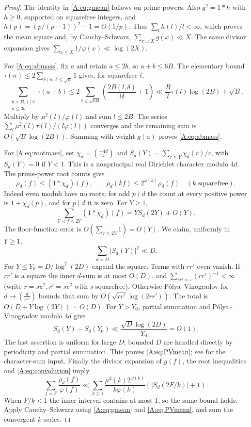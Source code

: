 \documentclass[10pt,reqno]{amsart}
\theoremstyle{definition}
\numberwithin{equation}{section}
\begin{document}
\begin{proof}
The identity in \eqref{A:eq:gmean} follows on prime powers. Also
$g^2=1*h$ with $h\ge0$, supported on squarefree integers, and
$h(p)=(p/(p-1))^2-1=O(1/p)$. Thus $\sum_lh(l)/l<\infty$, which proves
the mean square and, by Cauchy--Schwarz, $\sum_{x\asymp X}g(x)\ll X$.
The same divisor expansion gives $\sum_{x\le X}1/\varphi(x)\ll\log(2X)$.

For \eqref{A:eq:abmass}, fix $a$ and retain $a\le2b$, so $a+b\le6B$.
The elementary bound $\tau(n)\le2\sum_{\delta\mid n,\,\delta\le\sqrt n}1$
gives, for squarefree $l$,
\[
 \sum_{\substack{b\asymp B,\ l\mid b\\a\le2b}}\tau(a+b)
 \le2\sum_{\delta\le\sqrt{6B}}
       \left(\frac{2B(l,\delta)}{l\delta}+1\right)
 \ll\frac B l\tau(l)\log(2B)+\sqrt B.
\]
Multiply by $\mu^2(l)/\varphi(l)$ and sum $l\le2B$.
The series $\sum_l\mu^2(l)\tau(l)/(l\varphi(l))$ converges and the
remaining sum is $O(\sqrt B\log(2B))$. Summing with weight $g(a)$ proves
\eqref{A:eq:abmass}.

For \eqref{A:eq:rootmass}, set $\chi_d=(\frac{-4d}{\cdot})$ and
$S_d(Y)=\sum_{r\le Y}\chi_d(r)/r$, with $S_d(Y)=0$ if $Y<1$.
This is a nonprincipal real Dirichlet character modulo $4d$.
The prime-power root counts give
\[
 \rho_d(f)\le(1*\chi_d)(f),\qquad
 \rho_d(kf)\le2^{\omega(k)}\rho_d(f)\quad(k\text{ squarefree}).
\]
Indeed even moduli have no roots; for odd $p\nmid d$ the count at every
positive power is $1+\chi_d(p)$, and for $p\mid d$ it is zero.
For $Y\ge1$,
\begin{equation}\label{A:eq:convolution}
 \sum_{Y<f\le2Y}(1*\chi_d)(f)=Y S_d(2Y)+O(Y).
\end{equation}
The floor-function error is $O(\sum_{r\le2Y}1)=O(Y)$.
We claim, uniformly in $Y\ge1$,
\begin{equation}\label{A:eq:PVmean}
 \sum_{d\asymp D}|S_d(Y)|^2\ll D.
\end{equation}
For $Y\le Y_0=D/\log^2(2D)$ expand the square. Terms with $rr'$ even
vanish. If $rr'$ is a square the inner $d$-sum is at most $O(D)$, and
$\sum_{rr'=\square}(rr')^{-1}<\infty$ (write $r=su^2,r'=sv^2$ with $s$
squarefree). Otherwise P\'olya--Vinogradov for
$d\mapsto(\frac d{rr'})$ bounds that sum by
$O(\sqrt{rr'}\log(2rr'))$. The total is
$O(D+Y\log(2Y))=O(D)$. For $Y>Y_0$, partial summation and
P\'olya--Vinogradov modulo $4d$ give
\[
 S_d(Y)-S_d(Y_0)\ll\frac{\sqrt D\log(2D)}{Y_0}=O(1).
\]
The last assertion is uniform for large $D$; bounded $D$ are handled
directly by periodicity and partial summation. This proves
\eqref{A:eq:PVmean}; see \cite[Chapter~12]{IK} for the character-sum input.
Finally the divisor expansion of $g(f)$, the root inequalities and
\eqref{A:eq:convolution} imply
\[
 \sum_{f\asymp F}\frac{\rho_d(f)}{\varphi(f)}
 \ll\sum_{k\ge1}\frac{\mu^2(k)2^{\omega(k)}}{k\varphi(k)}
                 (|S_d(2F/k)|+1).
\]
When $F/k<1$ the inner interval contains at most $1$, so the same bound
holds. Apply Cauchy--Schwarz using \eqref{A:eq:gmean} and
\eqref{A:eq:PVmean}, and sum the convergent $k$-series.
\end{proof}
\end{document}

